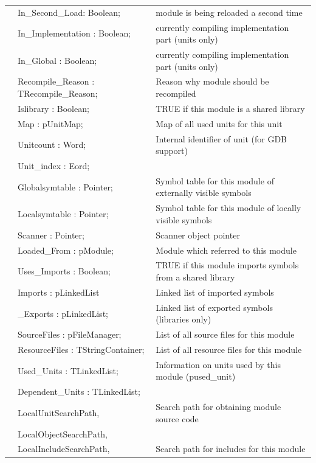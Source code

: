 \documentclass [a4paper,12pt]{article}
\begin{document}
\begin{longtable}{|l@{\extracolsep{\fill}}lp{7cm}|}
&\textsf{In{\_}Second{\_}Load: Boolean;}    & module is being reloaded a second time \\
&\textsf{In{\_}Implementation : Boolean;}& currently compiling implementation part (units only) \\
&\textsf{In{\_}Global : Boolean;}   & currently compiling implementation part (units only) \\
&\textsf{Recompile{\_}Reason : TRecompile{\_}Reason;}& Reason why module should be recompiled \\
&\textsf{Islibrary : Boolean;}&         TRUE if this module is a shared library \\
&\textsf{Map : pUnitMap;}       & Map of all used units for this unit \\
&\textsf{Unitcount : Word;}     & Internal identifier of unit (for GDB support) \\
&\textsf{Unit{\_}index : Eord;}     &  \\
&\textsf{Globalsymtable : Pointer;} & Symbol table for this module of externally visible symbols \\
&\textsf{Localsymtable : Pointer;}  & Symbol table for this module of locally visible symbols \\
&\textsf{Scanner : Pointer;}        & Scanner object pointer \\
&\textsf{Loaded{\_}From : pModule;} & Module which referred to this module \\
&\textsf{Uses{\_}Imports : Boolean;}    & TRUE if this module imports symbols from a shared library \\
&\textsf{Imports : pLinkedList}     & Linked list of imported symbols \\
&\textsf{{\_}Exports : pLinkedList;}    & Linked list of exported symbols (libraries only) \\
&\textsf{SourceFiles : pFileManager;}   & List of all source files for this module \\
&\textsf{ResourceFiles : TStringContainer;} & List of all resource files for this module \\
&\textsf{Used{\_}Units : TLinkedList; } & Information on units used by this module (pused{\_}unit) \\
&\textsf{Dependent{\_}Units : TLinkedList;}&  \\
&\textsf{LocalUnitSearchPath,}& Search path for obtaining module source code \\
&\textsf{LocalObjectSearchPath,}&  \\
&\textsf{LocalIncludeSearchPath,}& Search path for includes for this module \\

\end{longtable}
\end{document}
